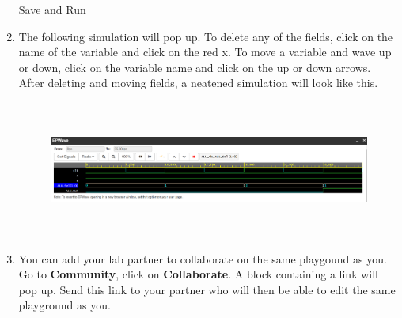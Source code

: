 \begin{enumerate}
    Save and Run
    
    \item The following simulation will pop up. To delete any of the fields, click on the name of the variable and click on the red x. To move a variable and wave up or down, click on the variable name and click on the up or down arrows. 
    After deleting and moving fields, a neatened simulation will look like this.
    
    \begin{figure}[H]
            \centering
            \includegraphics[width=1\columnwidth,height=4.5cm]{Figures/ALU_SIM.PNG}
            \label{fig: results}
    \end{figure}
    
    \item You can add your lab partner to collaborate on the same playgound as you. Go to \textbf{Community}, click on \textbf{Collaborate}. A block containing a link will pop up. Send this link to your partner who will then be able to edit the same playground as you. 
\end{enumerate}




